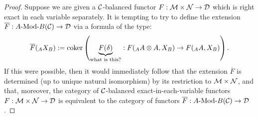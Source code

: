 \documentclass{amsart}
\begin{document}
\begin{proof}
Suppose we are given a $\mathcal C$-balanced functor $F:\mathcal M \times \mathcal N \to \mathcal D$ which is right exact in each variable separately. It is tempting to try to define the extension $\overline{F}: \Mod{A}{B}(\cC) \to \cD$ via a formula of the type:
\begin{equation*}
	\overline{F}({}_A X_B) := \operatorname*{coker} \left( \underbrace{{F}(\delta)}_{\textrm{what is this?}}: F({}_A A \otimes A,  X_B) \to {F}({}_A A , X_B) \right).
\end{equation*} 
If this were possible, then it would immediately follow that the extension $\overline{F}$ is determined (up to unique natural isomorphism) by its restriction to $\mathcal M \times \mathcal N$, and that, moreover, the category of $\mathcal C$-balanced exact-in-each-variable functors $F:\mathcal M \times \mathcal N \to \mathcal D$ is equivalent to the category of functors  
$\overline{F}: \Mod{A}{B}(\cC) \to \cD$.


\end{proof}
\end{document}

